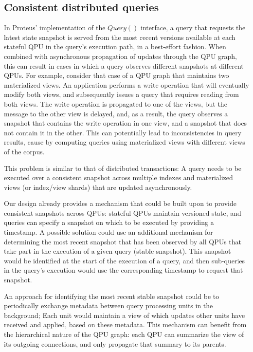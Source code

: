 \subsection{Consistent distributed queries}
\label{sec:future_consistent_snapshots}
In Proteus' implementation of the $Query()$ interface,
a query that requests the latest state snapshot is served from the most recent versions available at each stateful QPU
in the query's execution path, in a best-effort fashion.
When combined with asynchronous propagation of updates through the QPU graph,
this can result in cases in which a query observes different snapshots at different QPUs.
For example, consider that case of a QPU graph that maintains two materialized views.
An application performs a write operation that will eventually modify both views,
and subsequently issues a query that requires reading from both views.
The write operation is propagated to one of the views, but the message to the other view is delayed,
and, as a result, the query observes a snapshot that contains the write operation in one view,
and a snapshot that does not contain it in the other.
This can potentially lead to inconsistencies in query results,
cause by computing queries using materialized views with different views of the corpus.

This problem is similar to that of distributed transactions:
A query needs to be executed over a consistent snapshot across multiple indexes and materialized views (or index/view shards)
that are updated asynchronously.

Our design already provides a mechanism that could be built upon to provide consistent snapshots across QPUs:
stateful QPUs maintain versioned state,
and queries can specify a snapshot on which to be executed by providing a timestamp.
A possible solution could use an additional mechanism for determining the most recent snapshot that has been observed by
all QPUs that take part in the execution of a given query (stable snapshot).
This snapshot would be identified at the start of the execution of a query,
and then sub-queries in the query's execution would use the corresponding timestamp to request that snapshot.

An approach for identifying the most recent stable snapshot could be to periodically exchange
metadata between query processing units in the background;
Each unit would maintain a view of which updates other units have received and applied, based on these metadata.
This mechanism can benefit from the hierarchical nature of the QPU graph:
each QPU can summarize the view of its outgoing connections, and only propagate that summary to its parents.


